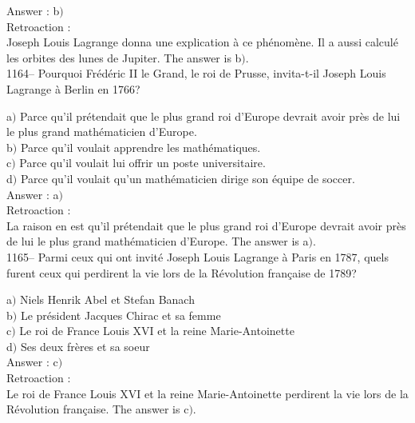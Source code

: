 ﻿\documentclass[letterpaper, 12pt]{article}
\begin{document}
Answer : b$)$\\

Retroaction : \\
Joseph Louis Lagrange donna une explication \`a ce ph\'enom\`ene. Il
a aussi calcul\'e les orbites des lunes de Jupiter.
The answer is b$)$.\\













1164-- Pourquoi Fr\'ed\'eric II le Grand, le roi de Prusse,
invita-t-il Joseph Louis Lagrange \`a Berlin en 1766?

a$)$ Parce qu'il pr\'etendait que \og le plus grand roi d'Europe
devrait avoir pr\`es de lui le plus grand math\'ematicien d'Europe\fg . \\
b$)$ Parce qu'il voulait apprendre les math\'ematiques. \\
c$)$ Parce qu'il voulait lui offrir un poste universitaire. \\
d$)$ Parce qu'il voulait qu'un math\'ematicien dirige son \'equipe de
soccer. \\

Answer : a$)$\\

Retroaction : \\
La raison en est qu'il pr\'etendait que \og le plus grand roi
d'Europe devrait avoir pr\`es de lui le plus grand math\'ematicien
d'Europe\fg .
The answer is a$)$.\\

1165-- Parmi ceux qui ont invit\'e Joseph Louis Lagrange \`a Paris
en 1787, quels furent ceux qui perdirent la vie lors de la
R\'evolution fran\c caise de 1789?

a$)$ Niels Henrik Abel et Stefan Banach \\
b$)$ Le pr\'esident Jacques Chirac et sa femme \\
c$)$ Le roi de France Louis XVI et la reine Marie-Antoinette \\
d$)$ Ses deux fr\`eres et sa soeur \\

Answer : c$)$\\

Retroaction : \\
Le roi de France Louis XVI et la reine Marie-Antoinette perdirent la vie
lors de la R\'evolution fran\c caise.
The answer is c$)$.\\
\end{document}
